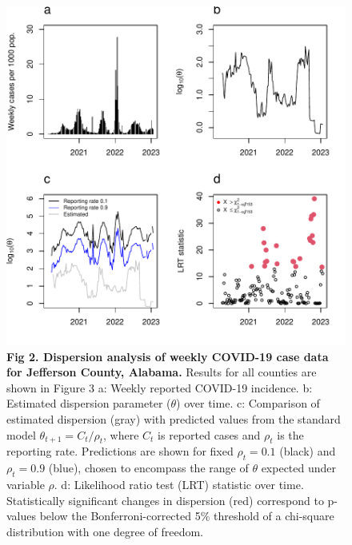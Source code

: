 \documentclass[11pt,letterpaper]{article}
\begin{document}
\clearpage
\begin{figure}[!ht]
\includegraphics[width=1\textwidth]{fig2}
\caption{{\bf Fig 2. Dispersion analysis of weekly COVID-19 case data for Jefferson County, Alabama.} 
Results for all counties are shown in Figure 3  %
a: Weekly reported COVID-19 incidence.  
b: Estimated dispersion parameter ($\theta$) over time.  
c: Comparison of estimated dispersion (gray) with predicted values from the standard model $\theta_{t+1} = C_t / \rho_t$, where $C_t$ is reported cases and $\rho_t$ is the reporting rate. Predictions are shown for fixed $\rho_t = 0.1$ (black) and $\rho_t = 0.9$ (blue), chosen to encompass the range of $\theta$ expected under variable $\rho$.  
d: Likelihood ratio test (LRT) statistic over time. Statistically significant changes in dispersion (red) correspond to p-values below the Bonferroni-corrected 5\% threshold of a chi-square distribution with one degree of freedom.  
}\label{fig2}
\end{figure}
\clearpage
\end{document}
